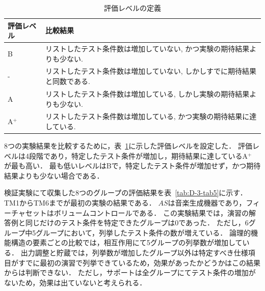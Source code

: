 \begin{table}[htbp]
\footnotesize
  \centering
  \caption{評価レベルの定義}
    \begin{tabular}{|l|p{14em}|}
       \hline
    評価レベル & \multicolumn{1}{l|}{比較結果} \\
        \hline
     B    & リストしたテスト条件数は増加していない, かつ実験の期待結果よりも少ない.  \\
        \hline
    -     & リストしたテスト条件数は増加していない, しかしすでに期待結果と同数である.  \\
        \hline
    A     & リストしたテスト条件数は増加している, しかし実験の期待結果よりも少ない.   \\
       \hline
    A${}^\text{+}$    & リストしたテスト条件数は増加している, かつ実験の期待結果に達している. \\
        \hline
    \end{tabular}%
  \label{tab:D-3-tab4}%
\end{table}%

8つの実験結果を比較するために，表~\ref{tab:D-3-tab4}に示した評価レベルを設定した．
評価レベルは4段階であり，特定したテスト条件が増加し，期待結果に達しているA${}^\text{+}$ が最も高い．
最も低いレベルはBで，特定したテスト条件が増加せず，かつ期待結果よりも少ない場合である．

検証実験にて収集した8つのグループの評価結果を表~\ref{tab:D-3-tab5}に示す．
TM1からTM6までが最初の実験の結果である．
$AS$は音楽生成機器であり，フィーチャセットはボリュームコントロールである．
この実験結果では，演習の解答例と同じだけのテスト条件を特定できたグループは0であった．
ただし，6グループ中5グループにおいて，列挙したテスト条件の数が増えている．
論理的機能構造の要素ごとの比較では，相互作用にて5グループの列挙数が増加している．
出力調整と貯蔵では，列挙数が増加したグループ以外は特定すべき仕様項目がすでに最初の演習で列挙できているため，効果があったかどうかはこの結果からは判断できない．
ただし，サポートは全グループにてテスト条件の増加がないため，効果は出ていないと考えられる．

